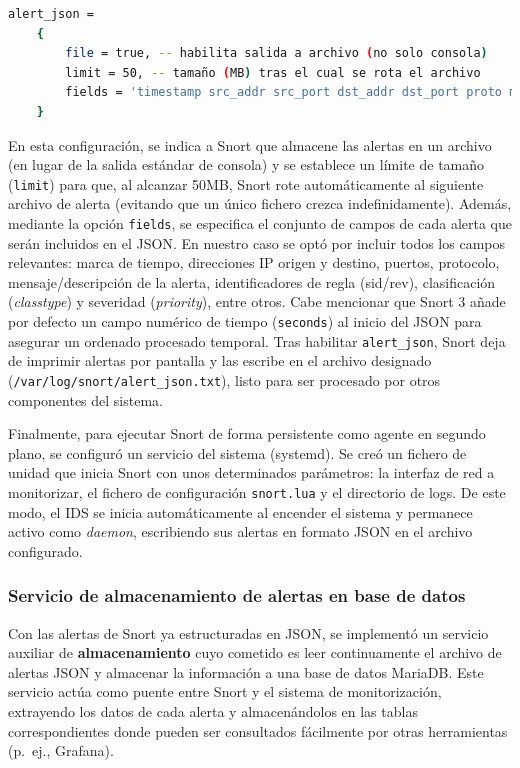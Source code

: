 \documentclass[11pt,a4paper,twoside]{report}
\begin{document}
\begin{lstlisting}[language=bash, caption={Configuración de Snort~3 para salida de alertas en JSON.}, label={lst:snort-json}]
	alert_json =
	{
		file = true, -- habilita salida a archivo (no solo consola)
		limit = 50, -- tamaño (MB) tras el cual se rota el archivo
		fields = 'timestamp src_addr src_port dst_addr dst_port proto msg sid priority classtype ...'
	}
\end{lstlisting}

En esta configuración, se indica a Snort que almacene las alertas en un archivo (en lugar de la salida estándar de consola) y se establece un límite de tamaño (\texttt{limit}) para que, al alcanzar 50MB, Snort rote automáticamente al siguiente archivo de alerta (evitando que un único fichero crezca indefinidamente). Además, mediante la opción \texttt{fields}, se especifica el conjunto de campos de cada alerta que serán incluidos en el JSON. En nuestro caso se optó por incluir todos los campos relevantes: marca de tiempo, direcciones IP origen y destino, puertos, protocolo, mensaje/descripción de la alerta, identificadores de regla (sid/rev), clasificación (\textit{classtype}) y severidad (\textit{priority}), entre otros. Cabe mencionar que Snort 3 añade por defecto un campo numérico de tiempo (\texttt{seconds}) al inicio del JSON para asegurar un ordenado procesado temporal. Tras habilitar \texttt{alert\_json}, Snort deja de imprimir alertas por pantalla y las escribe en el archivo designado (\texttt{/var/log/snort/alert\_json.txt}), listo para ser procesado por otros componentes del sistema.\newline

Finalmente, para ejecutar Snort de forma persistente como agente en segundo plano, se configuró un servicio del sistema (systemd). Se creó un fichero de unidad  que inicia Snort con unos determinados parámetros: la interfaz de red a monitorizar, el fichero de configuración \texttt{snort.lua} y el directorio de logs. De este modo, el IDS se inicia automáticamente al encender el sistema y permanece activo como \textit{daemon}, escribiendo sus alertas en formato JSON en el archivo configurado.

\subsubsection{Servicio de almacenamiento de alertas en base de datos}

Con las alertas de Snort ya estructuradas en JSON, se implementó un servicio auxiliar de \textbf{almacenamiento} cuyo cometido es leer continuamente el archivo de alertas JSON y almacenar la información a una base de datos MariaDB. Este servicio actúa como puente entre Snort y el sistema de monitorización, extrayendo los datos de cada alerta y almacenándolos en las tablas correspondientes donde pueden ser consultados fácilmente por otras herramientas (p.~ej., Grafana).\newline
\end{document}
